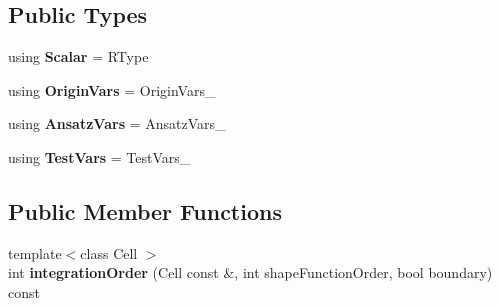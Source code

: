 \subsection*{Public Types}
\begin{DoxyCompactItemize}
\item 
\hypertarget{classSpacy_1_1KaskadeParabolic_1_1OCP_1_1ScalarProdFunctional_aeac18a39ed9a2405c00507760e9f58c9}{using {\bfseries Scalar} = R\-Type}\label{classSpacy_1_1KaskadeParabolic_1_1OCP_1_1ScalarProdFunctional_aeac18a39ed9a2405c00507760e9f58c9}

\item 
\hypertarget{classSpacy_1_1KaskadeParabolic_1_1OCP_1_1ScalarProdFunctional_accbb8f38b171a141c5b6b65675eb5bb9}{using {\bfseries Origin\-Vars} = Origin\-Vars\-\_\-}\label{classSpacy_1_1KaskadeParabolic_1_1OCP_1_1ScalarProdFunctional_accbb8f38b171a141c5b6b65675eb5bb9}

\item 
\hypertarget{classSpacy_1_1KaskadeParabolic_1_1OCP_1_1ScalarProdFunctional_a29086abaa355395f06e05942df5c7bc0}{using {\bfseries Ansatz\-Vars} = Ansatz\-Vars\-\_\-}\label{classSpacy_1_1KaskadeParabolic_1_1OCP_1_1ScalarProdFunctional_a29086abaa355395f06e05942df5c7bc0}

\item 
\hypertarget{classSpacy_1_1KaskadeParabolic_1_1OCP_1_1ScalarProdFunctional_a64a06718598aec4fb2f2f4e270adf61b}{using {\bfseries Test\-Vars} = Test\-Vars\-\_\-}\label{classSpacy_1_1KaskadeParabolic_1_1OCP_1_1ScalarProdFunctional_a64a06718598aec4fb2f2f4e270adf61b}

\end{DoxyCompactItemize}
\subsection*{Public Member Functions}
\begin{DoxyCompactItemize}
\item 
\hypertarget{classSpacy_1_1KaskadeParabolic_1_1OCP_1_1ScalarProdFunctional_a72040dde7e998f3594a2c63d5a370ce4}{{\footnotesize template$<$class Cell $>$ }\\int {\bfseries integration\-Order} (Cell const \&, int shape\-Function\-Order, bool boundary) const }\label{classSpacy_1_1KaskadeParabolic_1_1OCP_1_1ScalarProdFunctional_a72040dde7e998f3594a2c63d5a370ce4}

\end{DoxyCompactItemize}
